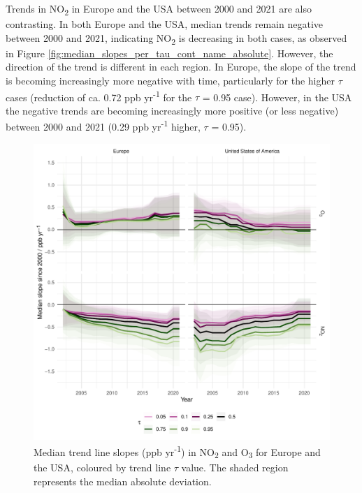 \documentclass[journal abbreviation, manuscript]{copernicus}
\begin{document}
Trends in NO\textsubscript{2} in Europe and the USA between 2000 and 2021 are also contrasting. In both Europe and the USA, median trends remain negative between 2000 and 2021, indicating NO\textsubscript{2} is decreasing in both cases, as observed in Figure \ref{fig:median_slopes_per_tau_cont_name_absolute}. However, the direction of the trend is different in each region. In Europe, the slope of the trend is becoming increasingly more negative with time, particularly for the higher $\tau$ cases (reduction of ca. 0.72 ppb yr\textsuperscript{-1} for the $\tau$ = 0.95 case). However, in the USA the negative trends are becoming increasingly more positive (or less negative) between 2000 and 2021 (0.29 ppb yr\textsuperscript{-1} higher, $\tau$ = 0.95). 


\begin{figure}[t]
\includegraphics[width=12cm]{figures/f8_slopes.pdf}
\caption{Median trend line slopes (ppb yr\textsuperscript{-1}) in NO\textsubscript{2} and O\textsubscript{3}  for Europe and the USA, coloured by trend line $\tau$ value. The shaded region represents the median absolute deviation.}
\label{fig:median_slopes_per_tau_cont_name_trends}
\end{figure}
\end{document}
